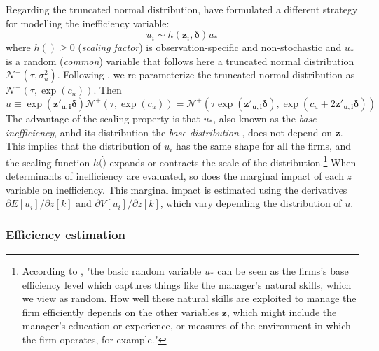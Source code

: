 \documentclass[nojss]{jss}
\begin{document}
Regarding the truncated normal distribution, \citet{wang02} have formulated a 
different strategy for modelling the inefficiency variable:
%
$$u_i \sim h(\mathbf{z}_i, \bm\delta)u_*$$
%
where $h() \geq 0$ (\textit{scaling factor}) is observation-specific and 
non-stochastic and $u_*$ is a random (\textit{common}) variable that follows 
here a truncated normal distribution $\mathcal{N}^+\left(\tau, \sigma_u^2\right)$. 
Following \cite{kum14}, we re-parameterize the truncated normal distribution as 
$\mathcal{N}^+\left(\tau, \exp{\left(c_u\right)}\right)$. Then
%
$$u \equiv \exp\left(\mathbf{z'_{u,i}}\bm\delta\right)\mathcal{N}^+
\left(\tau, \exp{\left(c_u\right)}\right)=\mathcal{N}^+\left(\tau\exp\left(
\mathbf{z'_{u,i}}\bm\delta\right), \exp{\left(c_u + 2\mathbf{z'_{u,i}}
\bm\delta\right)}\right)$$
%
The advantage of the scaling property is that $u_*$, also known as the \textit{base
inefficiency}, anhd its distribution the \textit{base distribution}
\citep{wang02, al06}, does not depend on $\mathbf{z}$. This implies
that the distribution of $u_i$ has the same shape for all the firms, and the 
scaling function $h(\dot)$ expands or contracts the scale of the 
distribution.\footnote{According to \citet[p.~203]{al06}, "the basic random 
variable $u_*$ can be seen as the firms's base efficiency level which captures 
things like the manager's natural skills, which we view as random. How well 
these natural skills are exploited to manage the firm efficiently depends on the 
other variables $\mathbf{z}$, which might include the manager's education or 
experience, or measures of the environment in which the firm operates, for example."} 
When determinants of inefficiency are evaluated, so does the marginal impact of 
each $z$ variable on inefficiency. This marginal impact is estimated using the
derivatives $\partial E\left[u_i\right]/\partial z\left[k\right]$ and
$\partial V\left[u_i\right]/\partial z\left[k\right]$, which vary 
depending the distribution of $u$.


\subsubsection{Efficiency estimation} 
\end{document}
